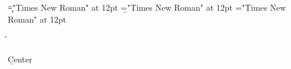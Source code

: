 \font\c="Times New Roman" at 12pt
\font\b="Times New Roman" at 12pt
\font\a="Times New Roman" at 12pt
 \r\n
{}
\centerline{\b{Center}
}

\bye
